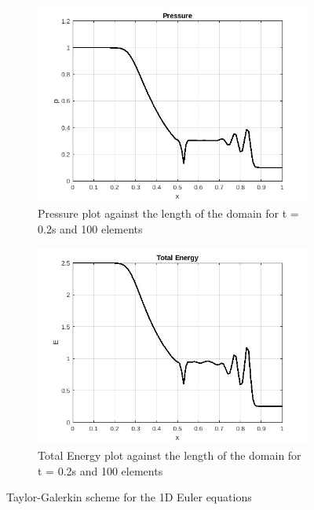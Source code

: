 \documentclass[12pt, oneside]{article}
\begin{document}
\begin{figure}[!h]
    \begin{subfigure}[!h]{0.45\textwidth}
	\includegraphics[width=\textwidth]{1d_euler_pres_tg.jpg}
	\caption{Pressure plot against the length of the domain for t = 0.2s and 100 elements}
	\label{fig-pres-tg}
    \end{subfigure}
    \hfill
    \begin{subfigure}[!h]{0.45\textwidth}
	\includegraphics[width=\textwidth]{1d_euler_energy_tg.jpg}
	\caption{Total Energy plot against the length of the domain for t = 0.2s and 100 elements}
	\label{fig-ene-tg}
    \end{subfigure}
    \caption{Taylor-Galerkin scheme for the 1D Euler equations}
\end{figure}
\end{document}
